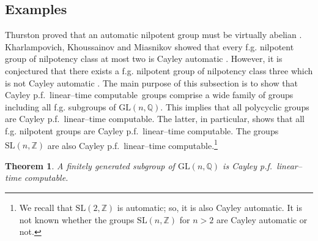 \documentclass[article,12pt]{elsarticle}
\newtheorem{theorem}{Theorem}
\newcommand\linearC{Cayley p.f.~linear--time computable}
\begin{document}
\subsection{Examples} 
 \label{examples_GL_nQ}
Thurston proved that an automatic 
nilpotent group must be virtually abelian 
\cite{Epsteinbook}. 
Kharlampovich, Khoussainov and 
Miasnikov showed that every f.g. nilpotent 
group of nilpotency class at most  two is 
Cayley automatic \cite{KKM11}. 
However, it is 
conjectured that 
there exists a f.g. nilpotent group of nilpotency 
class three which is not Cayley automatic 
\cite{SemiautomaticNilpGroups}. 
The main purpose of this subsection is to show     
that \linearC\ groups comprise 
a wide family of groups including all 
f.g. subgroups of $\mathrm{GL}(n,\mathbb{Q})$. 
This implies that all polycyclic 
groups are \linearC. 
The latter, in 
particular, shows that all f.g. nilpotent groups are \linearC. 
The groups  $\mathrm{SL}(n,\mathbb{Z})$ are 
also \linearC.\footnote{We recall that 
	$\mathrm{SL}(2,\mathbb{Z})$ is automatic; so, it 
	is also Cayley automatic. 
	It is not known whether the groups 
	$\mathrm{SL}(n,\mathbb{Z})$ for $n>2$ are 
	Cayley automatic or not.}     
\begin{theorem}
	\label{fgsubgroupglnq}	  
	A finitely generated subgroup of 
	$\mathrm{GL}(n,\mathbb{Q})$ is  \linearC.   
\end{theorem}	
\end{document}

